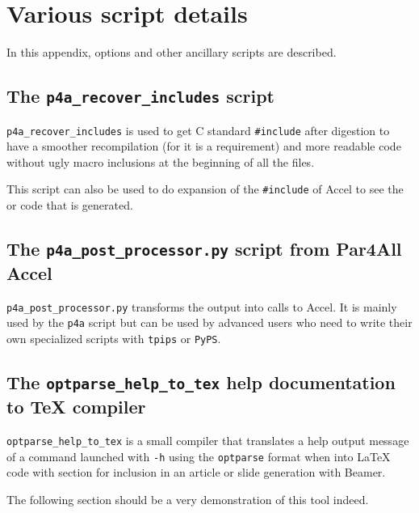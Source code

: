 \documentclass[a4paper]{article}
\begin{document}
\appendix

\section{Various script details}
\label{sec:vari-script-deta}

In this appendix, options and other ancillary scripts are described.

\subsection{The \protect\texttt{p4a\_recover\_includes} script}
\label{sec:p4a_recover_includes}

\verb|p4a_recover_includes| is used to get C standard \verb|#include|
after \Apips digestion to have a smoother recompilation (for \Acuda it is a
requirement) and more readable code without ugly macro inclusions at
the beginning of all the files.

This script can also be used to do expansion of the \verb|#include| of
\Apfa Accel to see the \Acuda or \Aopenmp code
that is generated.




\subsection{The \protect\texttt{p4a\_post\_processor.py} script from
  Par4All Accel}
\label{sec:p4a_p-script-from}

\verb|p4a_post_processor.py| transforms the \Apips
output into calls to \Apfa Accel. It is mainly used by the \texttt{p4a}
script but can be used by advanced users who need to write their own
specialized \Apips scripts with \texttt{tpips} or \texttt{PyPS}.




\subsection{The \protect\texttt{optparse\_help\_to\_tex} help
  documentation to \TeX{} compiler}
\label{sec:help-docum-tex}

\verb|optparse_help_to_tex| is a small compiler that translates a help
output message of a command launched with \texttt{-h} using the
\texttt{optparse} format when into La\TeX{} code with section for
inclusion in
an article or slide generation with Beamer.

The following section should be a very demonstration of this tool
indeed. \smiley



\end{document}
